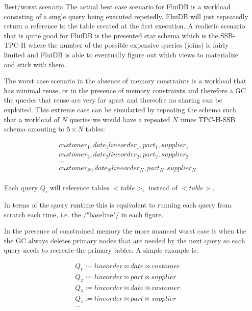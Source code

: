 \begin{corrected}{Best/worst scenaria}
  The actual best case scenario for FluiDB is a workload consisting of
  a single query being executed repetedly. FluiDB will just repeatedly
  return a reference to the table created at the first execution. A
  realistic scenario that is quite good for FluiDB is the presented
  star schema which is the SSB-TPC-H where the number of the possible
  expensive queries (joins) is fairly limited and FluiDB is able to
  eventually figure out which views to materialize and stick with
  them.

  The worst case scenario in the absence of memory constraints is a
  workload that has minimal reuse, or in the presence of memory
  constraints and therefore a GC the queries that reuse are very far
  apart and thereofre no sharing can be exploited. This extreme case can
  be simularted by repeating the schema such that a workload of \(N\)
  queries we would have a repeated \(N\) times TPC-H-SSB schema amouting
  to \(5 \times N\) tables:


  \begin{align*}
    customer_1, date_1 lineorder_1, part_1, supplier_1 \\
    customer_2, date_2 lineorder_2, part_2, supplier_2 \\
    ... \\
    customer_N, date_N lineorder_N, part_N, supplier_N \\
  \end{align*}

  Each query \(Q_i\) will reference tables \(<table>_i\) instead of
  \(<table>\).

  In terms of the query runtime this is equivalent to running each query
  from scratch each time, i.e. the /"baseline"/ in each figure.

  In the presence of constrained memory the more nuanced worst case is
  when the the GC always deletes primary nodes that are needed by the
  next query so each query needs to recreate the primary tables. A
  simple example is:


  \begin{align*}
    Q_1 := lineorder \Join date \Join customer \\
    Q_2 := lineorder \Join part \Join supplier \\
    Q_3 := lineorder \Join date \Join customer \\
    Q_4 := lineorder \Join part \Join supplier \\
    ...
  \end{align*}


\end{corrected}
